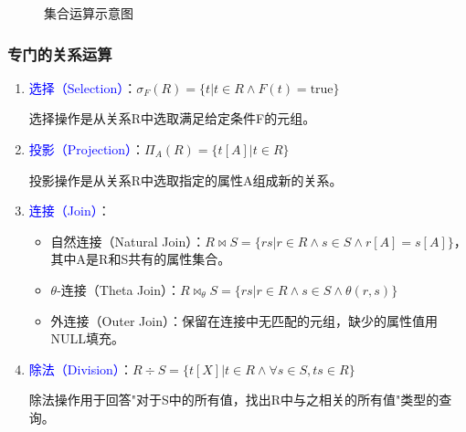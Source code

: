 \documentclass{../../note}
\begin{document}
\begin{figure}[h]
  \centering
  \caption{集合运算示意图}
\end{figure}

\subsubsection{专门的关系运算}

\begin{enumerate}
  \item \textcolor{blue}{选择（Selection）}：$\sigma_F(R) = \{t | t \in R \wedge F(t) = \textrm{true}\}$

    选择操作是从关系R中选取满足给定条件F的元组。

  \item \textcolor{blue}{投影（Projection）}：$\Pi_A(R) = \{t[A] | t \in R\}$

    投影操作是从关系R中选取指定的属性A组成新的关系。

  \item \textcolor{blue}{连接（Join）}：
    \begin{itemize}
      \item 自然连接（Natural Join）：$R \bowtie S = \{rs | r \in R \wedge s \in S \wedge r[A] = s[A]\}$，其中A是R和S共有的属性集合。
      \item $\theta$-连接（Theta Join）：$R \bowtie_\theta S = \{rs | r \in R \wedge s \in S \wedge \theta(r, s)\}$
      \item 外连接（Outer Join）：保留在连接中无匹配的元组，缺少的属性值用NULL填充。
    \end{itemize}

  \item \textcolor{blue}{除法（Division）}：$R \div S = \{t[X] | t \in R \wedge \forall s \in S, ts \in R\}$

    除法操作用于回答"对于S中的所有值，找出R中与之相关的所有值"类型的查询。
\end{enumerate}
\end{document}
